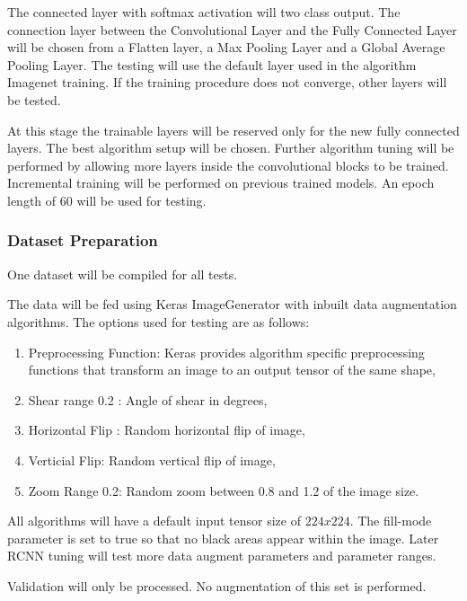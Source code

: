\documentclass{article}
\begin{document}
The connected layer with softmax activation will two class output. The connection layer between the Convolutional Layer and the Fully Connected Layer will be chosen from a Flatten layer, a Max Pooling Layer and a Global Average Pooling Layer. The testing will use the default layer used in the algorithm Imagenet training. If the training procedure does not converge, other layers will be tested.\newline

At this stage the trainable layers will be reserved only for the new fully connected layers. The best algorithm setup will be chosen. Further algorithm tuning will be performed by allowing more layers inside the convolutional blocks to be trained. Incremental training will be performed on previous trained models. An epoch length of 60 will be used for testing. \newline

\subsubsection{Dataset Preparation}

One dataset will be compiled for all tests.

The data will be fed using Keras ImageGenerator with inbuilt data augmentation algorithms. The options used for testing are as follows:
\begin{enumerate}
\item Preprocessing Function: Keras provides algorithm specific preprocessing functions that transform an image to an output tensor of the same shape,
\item Shear range 0.2 : Angle of shear in degrees,
\item Horizontal Flip : Random horizontal flip of image,
\item Verticial Flip: Random vertical flip of image,
\item Zoom Range 0.2: Random zoom between 0.8 and 1.2 of the image size.
\end{enumerate}

All algorithms will have a default input tensor size of $224 x 224$.
The fill-mode parameter is set to true so that no black areas appear within the image. Later RCNN tuning will test more data augment parameters and parameter ranges. \newline

Validation will only be processed. No augmentation of this set is performed.\newline
\end{document}
